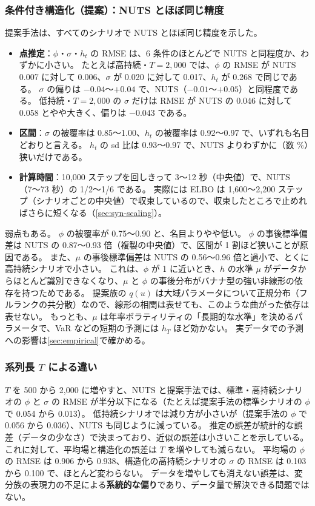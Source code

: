 \subsubsection{条件付き構造化（提案）：NUTS とほぼ同じ精度}

提案手法は、すべてのシナリオで NUTS とほぼ同じ精度を示した。

\begin{itemize}
  \item \textbf{点推定}：$\phi$・$\sigma$・$h_t$ の RMSE は、6 条件のほとんどで NUTS と同程度か、わずかに小さい。
    たとえば高持続・$T = 2{,}000$ では、$\phi$ の RMSE が NUTS 0.007 に対して 0.006、$\sigma$ が 0.020 に対して 0.017、$h_t$ が 0.268 で同じである。
    $\sigma$ の偏りは $-0.04$〜$+0.04$ で、NUTS（$-0.01$〜$+0.05$）と同程度である。
    低持続・$T = 2{,}000$ の $\sigma$ だけは RMSE が NUTS の 0.046 に対して 0.058 とやや大きく、偏りは $-0.043$ である。
  \item \textbf{区間}：$\sigma$ の被覆率は 0.85〜1.00、$h_t$ の被覆率は 0.92〜0.97 で、いずれも名目どおりと言える。
    $h_t$ の sd 比は 0.93〜0.97 で、NUTS よりわずかに（数 \%）狭いだけである。
  \item \textbf{計算時間}：10,000 ステップを回しきって 3〜12 秒（中央値）で、NUTS（7〜73 秒）の 1/2〜1/6 である。
    実際には ELBO は 1,600〜2,200 ステップ（シナリオごとの中央値）で収束しているので、収束したところで止めればさらに短くなる（\cref{sec:syn-scaling}）。
\end{itemize}

弱点もある。
$\phi$ の被覆率が 0.75〜0.90 と、名目よりやや低い。
$\phi$ の事後標準偏差は NUTS の 0.87〜0.93 倍（複製の中央値）で、区間が 1 割ほど狭いことが原因である。
また、$\mu$ の事後標準偏差は NUTS の 0.56〜0.96 倍と過小で、とくに高持続シナリオで小さい。
これは、$\phi$ が 1 に近いとき、$h$ の水準 $\mu$ がデータからほとんど識別できなくなり、$\mu$ と $\phi$ の事後分布がバナナ型の強い非線形の依存を持つためである。
提案族の $q(u)$ は大域パラメータについて正規分布（フルランクの共分散）なので、線形の相関は表せても、このような曲がった依存は表せない。
もっとも、$\mu$ は年率ボラティリティの「長期的な水準」を決めるパラメータで、VaR などの短期の予測には $h_T$ ほど効かない。
実データでの予測への影響は\cref{sec:empirical}で確かめる。

\subsubsection{系列長 $T$ による違い}

$T$ を 500 から 2,000 に増やすと、NUTS と提案手法では、標準・高持続シナリオの $\phi$ と $\sigma$ の RMSE が半分以下になる（たとえば提案手法の標準シナリオの $\phi$ で 0.054 から 0.013）。
低持続シナリオでは減り方が小さいが（提案手法の $\phi$ で 0.056 から 0.036）、NUTS も同じように減っている。
推定の誤差が統計的な誤差（データの少なさ）で決まっており、近似の誤差は小さいことを示している。
これに対して、平均場と構造化の誤差は $T$ を増やしても減らない。
平均場の $\phi$ の RMSE は 0.906 から 0.938、構造化の高持続シナリオの $\sigma$ の RMSE は 0.103 から 0.100 で、ほとんど変わらない。
データを増やしても消えない誤差は、変分族の表現力の不足による\textbf{系統的な偏り}であり、データ量で解決できる問題ではない。

